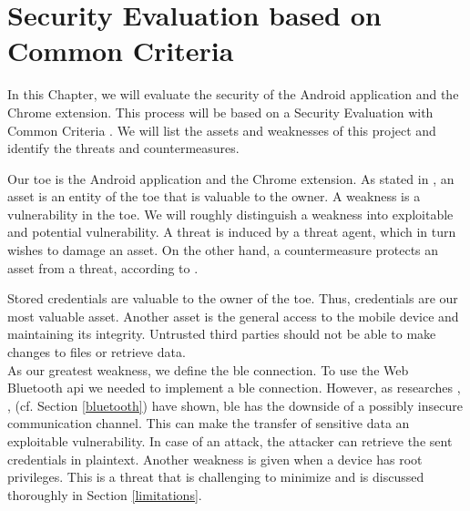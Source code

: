 \section{Security Evaluation based on Common Criteria} \label{seceval}
In this Chapter, we will evaluate the security of the Android application and the Chrome extension. This process will be based on a Security Evaluation with Common Criteria \cite{CC}. We will list the assets and weaknesses of this project and identify the threats and countermeasures.

Our \gls{toe} is the Android application and the Chrome extension. As stated in \cite{CC}, an asset is an entity of the \gls{toe} that is valuable to the owner. A weakness is a vulnerability in the \gls{toe}. We will roughly distinguish a weakness into exploitable and potential vulnerability.
A threat is induced by a threat agent, which in turn wishes to damage an asset. On the other hand, a countermeasure protects an asset from a threat, according to \cite{CC}.

Stored credentials are valuable to the owner of the \gls{toe}. Thus, credentials are our most valuable asset. Another asset is the general access to the mobile device and maintaining its integrity. Untrusted third parties should not be able to make changes to files or retrieve data. \\
%
As our greatest weakness, we define the \gls{ble} connection. To use the Web Bluetooth \gls{api} we needed to implement a \gls{ble} connection. However, as researches \cite{Ryan13}, \cite{GomezOP12}, \cite{IntroductionBLE} (cf. Section \ref{bluetooth}) have shown, \gls{ble} has the downside of a possibly insecure communication channel. This can make the transfer of sensitive data an exploitable vulnerability. In case of an attack, the attacker can retrieve the sent credentials in plaintext. Another weakness is given when a device has root privileges. This is a threat that is challenging to minimize and is discussed thoroughly in Section \ref{limitations}.

